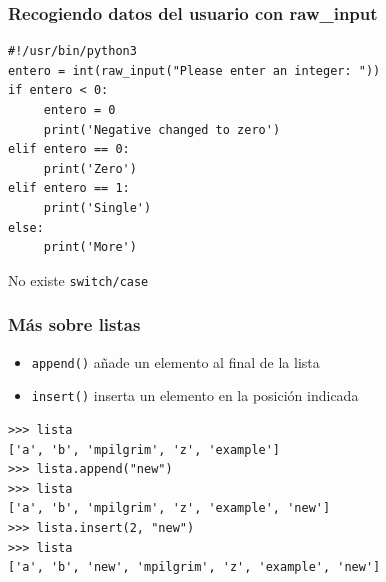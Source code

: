 \begin{frame}[fragile]
\frametitle{Recogiendo datos del usuario con raw\_input}

\begin{footnotesize}
\begin{verbatim}
#!/usr/bin/python3
entero = int(raw_input("Please enter an integer: "))
if entero < 0:
     entero = 0
     print('Negative changed to zero')
elif entero == 0:
     print('Zero')
elif entero == 1:
     print('Single')
else:
     print('More')
\end{verbatim}
\end{footnotesize}
  

No existe \verb|switch/case|
\end{frame}














\begin{frame}[fragile]
\frametitle{Más sobre listas}

\begin{itemize}
\item \verb|append()| añade un elemento al final de la lista
\item \verb|insert()| inserta un elemento en la posición indicada
\end{itemize}  

\begin{footnotesize}
\begin{verbatim}
>>> lista
['a', 'b', 'mpilgrim', 'z', 'example']
>>> lista.append("new")               
>>> lista
['a', 'b', 'mpilgrim', 'z', 'example', 'new']
>>> lista.insert(2, "new")           
>>> lista
['a', 'b', 'new', 'mpilgrim', 'z', 'example', 'new']
\end{verbatim}
\end{footnotesize}


\end{frame}



